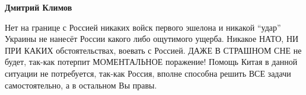 \begin{itemize}
\begin{itemize} %
\textbf{Дмитрий Климов} 

Нет на границе с Россией никаких войск первого эшелона
и никакой \enquote{удар} Украины не нанесёт России какого либо ощутимого ущерба.
Никакое НАТО, НИ ПРИ КАКИХ обстоятельствах, воевать с Россией. ДАЖЕ В СТРАШНОМ
СНЕ не будет, так-как потерпит МОМЕНТАЛЬНОЕ поражение! Помощь Китая в данной
ситуации не потребуется, так-как Россия, вполне способна решить ВСЕ задачи
самостоятельно, а в остальном Вы правы.
\end{itemize} %


\end{itemize} %
